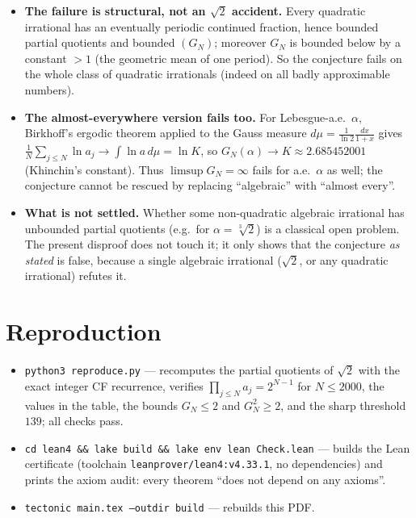 \documentclass[11pt]{article}
\begin{document}
\begin{itemize}
\item \textbf{The failure is structural, not an $\sqrt2$ accident.} Every quadratic irrational
has an eventually periodic continued fraction, hence bounded partial quotients and bounded
$(G_N)$; moreover $G_N$ is bounded below by a constant $>1$ (the geometric mean of one period).
So the conjecture fails on the whole class of quadratic irrationals (indeed on all badly
approximable numbers).
\item \textbf{The almost-everywhere version fails too.} For Lebesgue-a.e.\ $\alpha$, Birkhoff's
ergodic theorem applied to the Gauss measure $d\mu=\frac{1}{\ln2}\frac{dx}{1+x}$ gives
$\frac1N\sum_{j\le N}\ln a_j\to\int\ln a\,d\mu=\ln K$, so $G_N(\alpha)\to K\approx2.685452001$
(Khinchin's constant). Thus $\limsup G_N=\infty$ fails for a.e.\ $\alpha$ as well; the
conjecture cannot be rescued by replacing ``algebraic'' with ``almost every''.
\item \textbf{What is not settled.} Whether some non-quadratic algebraic irrational has
unbounded partial quotients (e.g.\ for $\alpha=\sqrt[3]{2}$) is a classical open problem.
The present disproof does not touch it; it only shows that the conjecture \emph{as stated} is
false, because a single algebraic irrational ($\sqrt2$, or any quadratic irrational) refutes it.
\end{itemize}

\section{Reproduction}

\begin{itemize}
\item \texttt{python3 reproduce.py} --- recomputes the partial quotients of $\sqrt2$ with the
exact integer CF recurrence, verifies $\prod_{j\le N}a_j=2^{N-1}$ for $N\le2000$, the values in
the table, the bounds $G_N\le2$ and $G_N^2\ge2$, and the sharp threshold $139$; all checks pass.
\item \texttt{cd lean4 \&\& lake build \&\& lake env lean Check.lean} --- builds the Lean
certificate (toolchain \texttt{leanprover/lean4:v4.33.1}, no dependencies) and prints the axiom
audit: every theorem ``does not depend on any axioms''.
\item \texttt{tectonic main.tex --outdir build} --- rebuilds this PDF.
\end{itemize}
\end{document}
